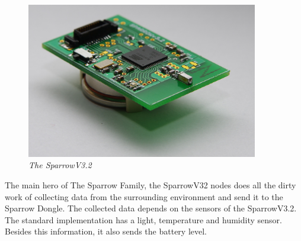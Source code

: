 \begin{figure}[ht]
\begin{center}
\includegraphics[width=0.9\textwidth]{hw_platform/Sparrowv32.jpg}
\end{center}
\caption{\small \itshape{The SparrowV3.2}}
\end{figure}


The main hero of The Sparrow Family, the SparrowV32 nodes does all the dirty work of collecting data from the surrounding environment and send it to the Sparrow Dongle. The collected data depends on the sensors of the SparrowV3.2. The standard implementation has a light, temperature and humidity sensor. Besides this information, it also sends the battery level.
